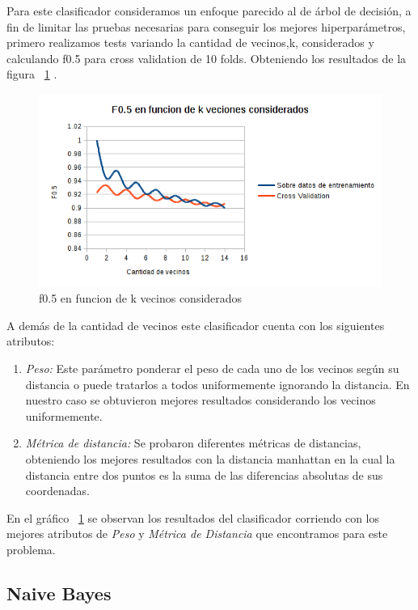 \begin{enumerate}
Para este clasificador consideramos un enfoque parecido al de árbol de decisión, a fin de limitar las pruebas necesarias para conseguir los mejores hiperparámetros, primero realizamos tests variando la cantidad de vecinos,k, considerados y calculando f0.5 para cross validation de 10 folds. Obteniendo los resultados de la figura ~\ref{fig:knn_f05_en_funcion_vecinos} .
\begin{figure}[H]
    \centering
        \includegraphics[width=\textwidth]{plots/knn_f05_en_funcion_vecinos.png}
        \caption{f0.5 en funcion de k vecinos considerados}
        \label{fig:knn_f05_en_funcion_vecinos}
\end{figure}
	A demás de la cantidad de vecinos este clasificador cuenta con los siguientes atributos:
 \begin{enumerate}
\item \textit{Peso:} Este parámetro ponderar el peso de cada uno de los vecinos según su distancia o puede tratarlos a todos uniformemente ignorando la distancia. En nuestro caso se obtuvieron mejores resultados considerando los vecinos uniformemente.  
\item \textit{Métrica de distancia:} Se probaron diferentes métricas de distancias, obteniendo los mejores resultados con la distancia manhattan en la cual la distancia entre dos puntos es la suma de las diferencias absolutas de sus coordenadas.
\end{enumerate}
	En el gráfico ~\ref{fig:knn_f05_en_funcion_vecinos} se observan los resultados del clasificador corriendo con los mejores atributos de \textit{Peso} y \textit{Métrica de Distancia} que encontramos para este problema.

\subsection{Naive Bayes}


\end{enumerate}
